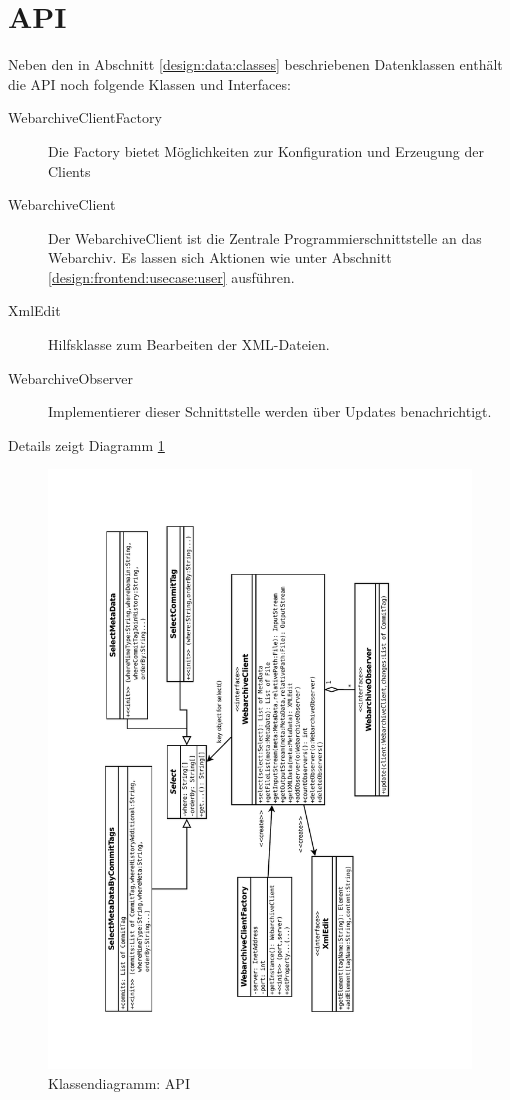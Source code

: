 \section{API}
Neben den in Abschnitt \ref{design:data:classes} beschriebenen Datenklassen enthält die
API noch folgende Klassen und Interfaces:
\begin{description}
	\item [WebarchiveClientFactory]
		Die Factory bietet Möglichkeiten zur Konfiguration und Erzeugung der Clients
	\item [WebarchiveClient]
		Der WebarchiveClient ist die Zentrale Programmierschnittstelle an das Webarchiv.
		Es lassen sich Aktionen wie unter Abschnitt \ref{design:frontend:usecase:user} ausführen.
	\item [XmlEdit]
		Hilfsklasse zum Bearbeiten der XML-Dateien.
	\item [WebarchiveObserver]
		Implementierer dieser Schnittstelle werden über Updates benachrichtigt.
\end{description}
Details zeigt Diagramm \ref{dia:design:frontend:cl:api}
\begin{figure}[!h]
	\centering
	\label{dia:design:frontend:cl:api}
	\includegraphics[angle=270, width=1.1\textwidth]{design/frontend/classes/api-Klassen.pdf}
	\caption{Klassendiagramm: API}
\end{figure}

